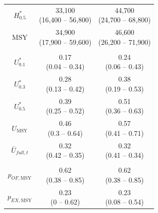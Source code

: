 \documentclass[12pt,]{book}
\theoremstyle{definition}
\theoremstyle{definition}
\theoremstyle{definition}
\theoremstyle{remark}
\begin{document}
\begin{table}
\begin{tabular}[t]{ccc}
\hspace{1em}$H^*_{0.5}$ & \makecell[c]{33,100\\(16,400 -- 56,800)} & \makecell[c]{44,700\\(24,700 -- 68,800)}\\
\hspace{1em}$\text{MSY}$ & \makecell[c]{34,900\\(17,900 -- 59,600)} & \makecell[c]{46,600\\(26,200 -- 71,900)}\\
\addlinespace[0.3em]
\multicolumn{3}{l}{\textbf{Exploitation Rate}}\\
\hline
\hspace{1em}$U^*_{0.1}$ & \makecell[c]{0.17\\(0.04 -- 0.34)} & \makecell[c]{0.24\\(0.06 -- 0.43)}\\
\hspace{1em}$U^*_{0.3}$ & \makecell[c]{0.28\\(0.13 -- 0.42)} & \makecell[c]{0.38\\(0.19 -- 0.53)}\\
\hspace{1em}$U^*_{0.5}$ & \makecell[c]{0.39\\(0.25 -- 0.52)} & \makecell[c]{0.51\\(0.36 -- 0.63)}\\
\hspace{1em}$U_{\text{MSY}}$ & \makecell[c]{0.46\\(0.3 -- 0.64)} & \makecell[c]{0.57\\(0.41 -- 0.71)}\\
\hspace{1em}$\bar{U}_{full,t}$ & \makecell[c]{0.32\\(0.42 -- 0.35)} & \makecell[c]{0.32\\(0.41 -- 0.34)}\\
\addlinespace[0.3em]
\multicolumn{3}{l}{\textbf{Biodiversity}}\\
\hline
\hspace{1em}$p_{OF,\text{MSY}}$ & \makecell[c]{0.62\\(0.38 -- 0.85)} & \makecell[c]{0.62\\(0.38 -- 0.85)}\\
\hspace{1em}$p_{EX,\text{MSY}}$ & \makecell[c]{0.23\\(0 -- 0.62)} & \makecell[c]{0.23\\(0.08 -- 0.54)}\\
\bottomrule
\end{tabular}
\end{table}
\end{document}
